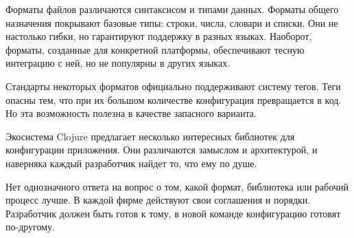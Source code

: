 Форматы файлов различаются синтаксисом и типами данных. Форматы общего
назначения покрывают базовые типы: строки, числа, словари и списки. Они не
настолько гибки, но гарантируют поддержку в разных языках. Наоборот, форматы,
созданные для конкретной платформы, обеспечивают тесную интеграцию с ней, но не
популярны в других языках.

Стандарты некоторых форматов официально поддерживают систему тегов. Теги опасны
тем, что при их большом количестве конфигурация превращается в код. Но эта
возможность полезна в качестве запасного варианта.

Экосистема Clojure предлагает несколько интересных библиотек для конфигурации
приложения. Они различаются замыслом и архитектурой, и наверняка каждый
разработчик найдет то, что ему по душе.

Нет однозначного ответа на вопрос о том, какой формат, библиотека или рабочий
процесс лучше. В каждой фирме действуют свои соглашения и порядки. Разработчик
должен быть готов к тому, в новой команде конфигурацию готовят по-другому.
